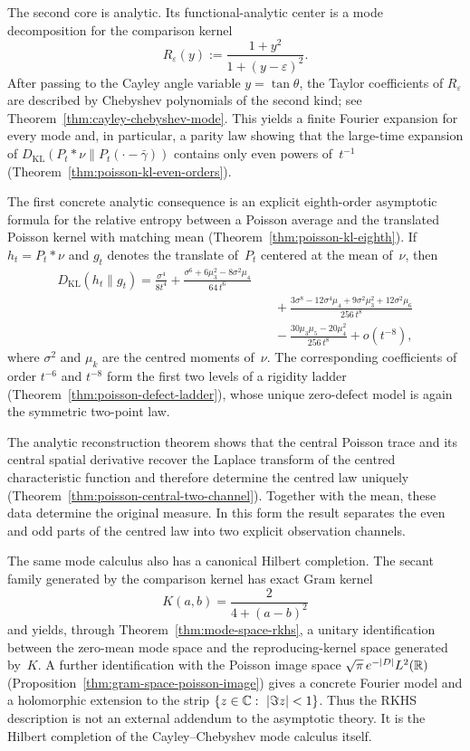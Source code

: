 The second core is analytic.  Its functional-analytic center is a mode
decomposition for the comparison kernel
\[
R_\varepsilon(y):=\frac{1+y^2}{1+(y-\varepsilon)^2}.
\]
After passing to the Cayley angle variable $y=\tan\theta$, the Taylor
coefficients of $R_\varepsilon$ are described by Chebyshev polynomials of
the second kind; see Theorem~\ref{thm:cayley-chebyshev-mode}.  This yields
a finite Fourier expansion for every mode and, in particular, a parity law
showing that the large-time expansion of
$D_{\mathrm{KL}}(P_t*\nu\|P_t(\cdot-\bar\gamma))$ contains only even powers
of~$t^{-1}$ (Theorem~\ref{thm:poisson-kl-even-orders}).

The first concrete analytic consequence is an explicit eighth-order
asymptotic formula for the relative entropy between a Poisson average and
the translated Poisson kernel with matching mean
(Theorem~\ref{thm:poisson-kl-eighth}).  If $h_t=P_t*\nu$ and $g_t$ denotes
the translate of~$P_t$ centered at the mean of~$\nu$, then
\begin{align*}
D_{\mathrm{KL}}(h_t\|g_t)
=\frac{\sigma^4}{8t^4}
+\frac{\sigma^6+6\mu_3^2-8\sigma^2\mu_4}{64\,t^6} \\
&\quad
+\frac{3\sigma^8-12\sigma^4\mu_4+9\sigma^2\mu_3^2+12\sigma^2\mu_6}{256\,t^8} \\
&\quad
-\frac{30\mu_3\mu_5-20\mu_4^2}{256\,t^8}
+o(t^{-8}),
\end{align*}
where $\sigma^2$ and $\mu_k$ are the centred moments of~$\nu$.  The
corresponding coefficients of order $t^{-6}$ and $t^{-8}$ form the first
two levels of a rigidity ladder (Theorem~\ref{thm:poisson-defect-ladder}),
whose unique zero-defect model is again the symmetric two-point law.

The analytic reconstruction theorem shows that the central Poisson trace
and its central spatial derivative recover the Laplace transform of the
centred characteristic function and therefore determine the centred law
uniquely (Theorem~\ref{thm:poisson-central-two-channel}).  Together with
the mean, these data determine the original measure.  In this form the
result separates the even and odd parts of the centred law into two
explicit observation channels.

The same mode calculus also has a canonical Hilbert completion.  The
secant family generated by the comparison kernel has exact Gram kernel
\[
K(a,b)=\frac{2}{4+(a-b)^2}
\]
and yields, through Theorem~\ref{thm:mode-space-rkhs}, a unitary
identification between the zero-mean mode space and the
reproducing-kernel space generated by~$K$.  A further identification with
the Poisson image space $\sqrt{\pi}\,e^{-|D|}L^2(\mathbb{R})$
(Proposition~\ref{thm:gram-space-poisson-image}) gives a concrete Fourier
model and a holomorphic extension to the strip
$\{z\in\mathbb{C}:\ |\Im z|<1\}$.  Thus the RKHS description is not an
external addendum to the asymptotic theory.  It is the Hilbert
completion of the Cayley--Chebyshev mode calculus itself.

